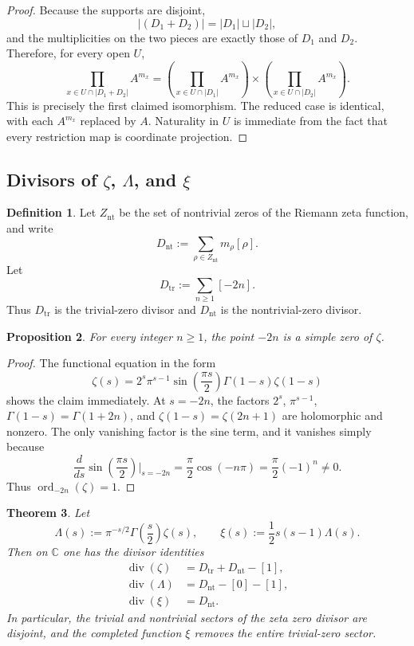 \documentclass[11pt,a4paper]{article}
\numberwithin{equation}{section}
\newtheorem{theorem}{Theorem}[section]
\newtheorem{proposition}[theorem]{Proposition}
\theoremstyle{definition}
\newtheorem{definition}[theorem]{Definition}
\theoremstyle{remark}
\DeclareMathOperator{\ord}{ord}
\DeclareMathOperator{\divv}{div}
\newcommand{\CC}{\mathbb C}
\begin{document}
\begin{proof}
Because the supports are disjoint,
\[
|(D_1+D_2)|=|D_1|\sqcup |D_2|,
\]
and the multiplicities on the two pieces are exactly those of $D_1$ and $D_2$.  Therefore, for every open $U$,
\[
\prod_{x\in U\cap |D_1+D_2|} A^{m_x}
=
\left(\prod_{x\in U\cap |D_1|} A^{m_x}\right)
\times
\left(\prod_{x\in U\cap |D_2|} A^{m_x}\right).
\]
This is precisely the first claimed isomorphism.  The reduced case is identical, with each $A^{m_x}$ replaced by $A$.  Naturality in $U$ is immediate from the fact that every restriction map is coordinate projection.
\end{proof}

\subsection{Divisors of $\zeta$, $\Lambda$, and $\xi$}

\begin{definition}
Let $Z_{\mathrm{nt}}$ be the set of nontrivial zeros of the Riemann zeta function, and write
\[
D_{\mathrm{nt}}:=\sum_{\rho\in Z_{\mathrm{nt}}} m_\rho[\rho].
\]
Let
\[
D_{\mathrm{tr}}:=\sum_{n\ge 1}[-2n].
\]
Thus $D_{\mathrm{tr}}$ is the trivial-zero divisor and $D_{\mathrm{nt}}$ is the nontrivial-zero divisor.
\end{definition}

\begin{proposition}\label{P2:prop:trivial-zeros-simple-again}
For every integer $n\ge 1$, the point $-2n$ is a simple zero of $\zeta$.
\end{proposition}

\begin{proof}
The functional equation in the form
\begin{equation}\label{P2:eq:functional-zeta}
\zeta(s)=2^s\pi^{s-1}\sin\!\left(\frac{\pi s}{2}\right)\Gamma(1-s)\zeta(1-s)
\end{equation}
shows the claim immediately.  At $s=-2n$, the factors $2^s$, $\pi^{s-1}$, $\Gamma(1-s)=\Gamma(1+2n)$, and $\zeta(1-s)=\zeta(2n+1)$ are holomorphic and nonzero.  The only vanishing factor is the sine term, and it vanishes simply because
\[
\frac{d}{ds}\sin\!\left(\frac{\pi s}{2}\right)\Big|_{s=-2n}
=\frac{\pi}{2}\cos(-n\pi)=\frac{\pi}{2}(-1)^n\neq 0.
\]
Thus $\ord_{-2n}(\zeta)=1$.
\end{proof}

\begin{theorem}\label{P2:thm:divisor-identities}
Let
\[
\Lambda(s):=\pi^{-s/2}\Gamma\!\left(\frac{s}{2}\right)\zeta(s),
\qquad
\xi(s):=\frac12 s(s-1)\Lambda(s).
\]
Then on $\CC$ one has the divisor identities
\begin{align*}
\divv(\zeta)&=D_{\mathrm{tr}}+D_{\mathrm{nt}}-[1],\\
\divv(\Lambda)&=D_{\mathrm{nt}}-[0]-[1],\\
\divv(\xi)&=D_{\mathrm{nt}}.
\end{align*}
In particular, the trivial and nontrivial sectors of the zeta zero divisor are disjoint, and the completed function $\xi$ removes the entire trivial-zero sector.
\end{theorem}
\end{document}
